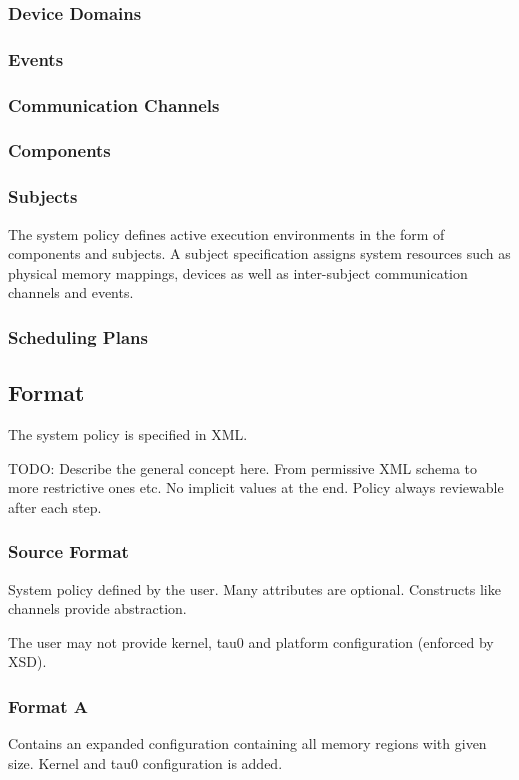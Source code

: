 \documentclass[a4paper,twoside,titlepage]{article}
\begin{document}
\subsubsection{Device Domains}
\subsubsection{Events}
\subsubsection{Communication Channels}
\subsubsection{Components}
\subsubsection{Subjects}
The system policy defines active execution environments in the form of
components and subjects. A subject specification assigns system resources such
as physical memory mappings, devices as well as inter-subject communication
channels and events.

\subsubsection{Scheduling Plans}

\subsection{Format}
The system policy is specified in XML.

TODO: Describe the general concept here. From permissive XML schema to more
restrictive ones etc. No implicit values at the end. Policy always reviewable
after each step.

\subsubsection{Source Format}
System policy defined by the user. Many attributes are optional. Constructs
like channels provide abstraction.

The user may not provide kernel, tau0 and platform configuration (enforced by
XSD).

\subsubsection{Format A}
Contains an expanded configuration containing all memory regions with given
size. Kernel and tau0 configuration is added.
\end{document}
